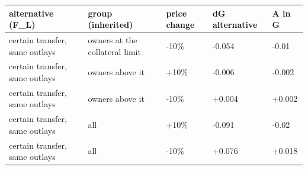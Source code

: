 \begingroup\small
\setlength{\tabcolsep}{3pt}
\renewcommand{\arraystretch}{1.04}
\begin{tabularx}{\linewidth}{XXXXX}
\toprule
alternative (F\_L) & group (inherited) & price change & dG alternative & A in G \\
\midrule
certain transfer, same outlays & owners at the collateral limit & -10\% & -0.054 & -0.01 \\
certain transfer, same outlays & owners above it & +10\% & -0.006 & -0.002 \\
certain transfer, same outlays & owners above it & -10\% & +0.004 & +0.002 \\
certain transfer, same outlays & all & +10\% & -0.091 & -0.02 \\
certain transfer, same outlays & all & -10\% & +0.076 & +0.018 \\
\bottomrule
\end{tabularx}
\endgroup
